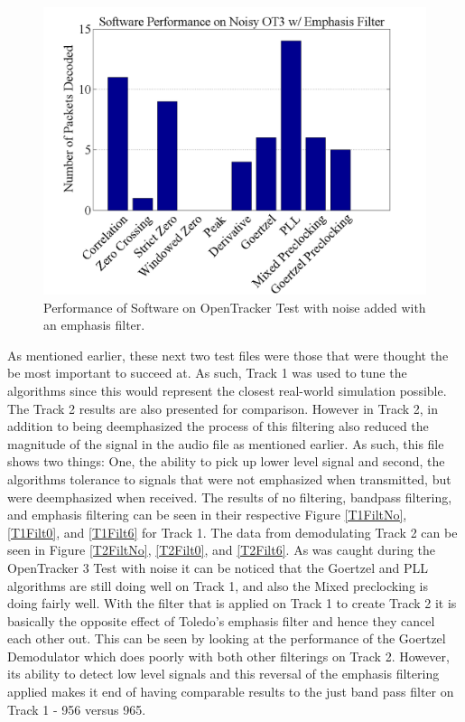 \begin{figure}
  \centering
	\includegraphics[width=0.75\linewidth]{images/SoftwarePerformanceonNoisyOT3wEmphasisFilter.png} 
	\caption{Performance of Software on OpenTracker Test with noise added with an emphasis filter.}
   \label{OTNoiseFilt6}
\end{figure}

As mentioned earlier, these next two test files were those that were thought the be most important to succeed at. As such, Track 1 was used to tune the algorithms since this would represent the closest real-world simulation possible. The Track 2 results are also presented for comparison. However in Track 2, in addition to being deemphasized the process of this filtering also reduced the magnitude of the signal in the audio file as mentioned earlier. As such, this file shows two things: One, the ability to pick up lower level signal and second, the algorithms tolerance to signals that were not emphasized when transmitted, but were deemphasized when received. The results of no filtering, bandpass filtering, and emphasis filtering can be seen in their respective Figure \ref{T1FiltNo}, \ref{T1Filt0}, and \ref{T1Filt6} for Track 1. The data from demodulating Track 2 can be seen in Figure \ref{T2FiltNo}, \ref{T2Filt0}, and \ref{T2Filt6}. As was caught during the OpenTracker 3 Test with noise it can be noticed that the Goertzel and PLL algorithms are still doing well on Track 1, and also the Mixed preclocking is doing fairly well. With the filter that is applied on Track 1 to create Track 2 it is basically the opposite effect of Toledo's emphasis filter and hence they cancel each other out. This can be seen by looking at the performance of the Goertzel Demodulator which does poorly with both other filterings on Track 2. However, its ability to detect low level signals and this reversal of the emphasis filtering applied makes it end of having comparable results to the just band pass filter on Track 1 - 956 versus 965. 

